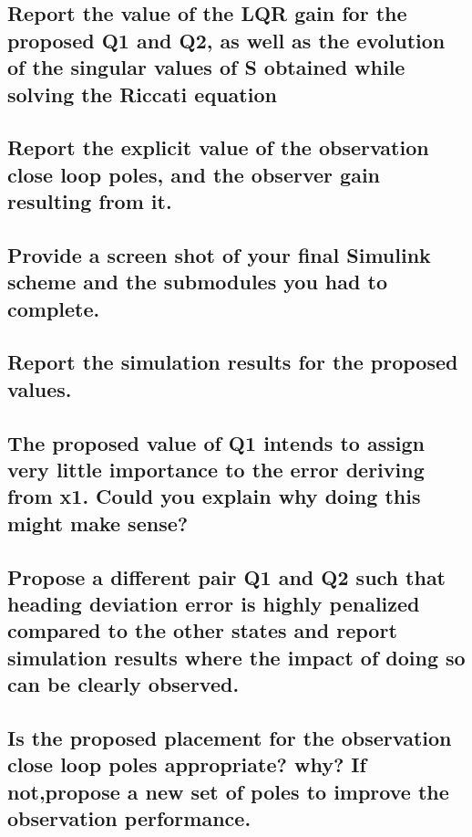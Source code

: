 \subsection{ Report the value of the LQR gain for the proposed Q1 and Q2, as well as the evolution of the singular values of S obtained while solving the Riccati equation}


\subsection{Report the explicit value of the observation close loop poles, and the observer gain resulting
from it.}


\subsection{Provide a screen shot of your final Simulink scheme and the submodules you had to complete.}


\subsection{Report the simulation results for the proposed values.}


\subsection{The proposed value of Q1 intends to assign very little importance to the error deriving from x1. Could you explain why doing this might make sense?}


\subsection{Propose a different pair Q1 and Q2 such that heading deviation error is highly penalized compared to the other states and report simulation results where the impact of doing so can be clearly observed.}


\subsection{Is the proposed placement for the observation close loop poles appropriate? why? If not,propose a new set of poles to improve the observation performance.}